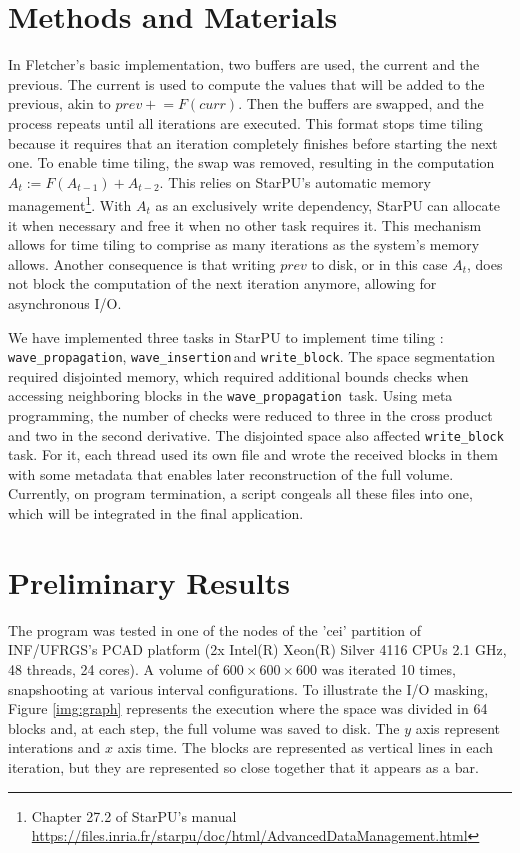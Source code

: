 \documentclass[12pt]{article}
\newcommand{\waveprop}{\texttt{wave\_propagation}}
\newcommand{\waveinsert}{\texttt{wave\_insertion}}
\newcommand{\blockwrite}{\texttt{write\_block}}
\begin{document}
\section{Methods and Materials}
\label{sec:methodsandmaterials}
	In Fletcher's basic implementation, two buffers are used, the current and the previous. The current is used to compute the values that will be added to the previous, akin to $prev +\!\!= F(curr)$. Then the buffers are swapped, and the process repeats until all iterations are executed. This format stops time tiling because it requires that an iteration completely finishes before starting the next one. To enable time tiling, the swap was removed, resulting in the computation $A_{t} := F(A_{t-1}) + A_{t-2}$. This relies on StarPU's automatic memory management\footnote{Chapter 27.2 of StarPU's manual \url{https://files.inria.fr/starpu/doc/html/AdvancedDataManagement.html}}. With $A_{t}$ as an exclusively write dependency, StarPU can allocate it when necessary and free it when no other task requires it. This mechanism allows for time tiling to comprise as many iterations as the system's memory allows. Another consequence is that writing $prev$ to disk, or in this case $A_t$, does not block the computation of the next iteration anymore, allowing for asynchronous I/O.

	We have implemented three tasks in StarPU to implement time tiling : \waveprop, \waveinsert\,and \blockwrite. The space segmentation required disjointed memory, which required additional bounds checks when accessing neighboring blocks in the \waveprop\, task. Using meta programming, the number of checks were reduced to three in the cross product and two in the second derivative. The disjointed space also affected \blockwrite\, task. For it, each thread used its own file and wrote the received blocks in them with some metadata that enables later reconstruction of the full volume. Currently, on program termination, a script congeals all these files into one, which will be integrated in the final application. 

\section{Preliminary Results}
\label{sec:parcialresults}
	The program was tested in one of the nodes of the 'cei' partition of INF/UFRGS's PCAD platform (2x Intel(R) Xeon(R) Silver 4116 CPUs 2.1 GHz, 48 threads, 24 cores). A volume of $600 \times 600 \times 600$ was iterated 10 times, snapshooting at various interval configurations. To illustrate the I/O masking, Figure \ref{img:graph} represents the execution where the space was divided in 64 blocks and, at each step, the full volume was saved to disk. The $y$ axis represent interations and $x$ axis time. The blocks are represented as vertical lines in each iteration, but they are represented so close together that it appears as a bar.
\end{document}
